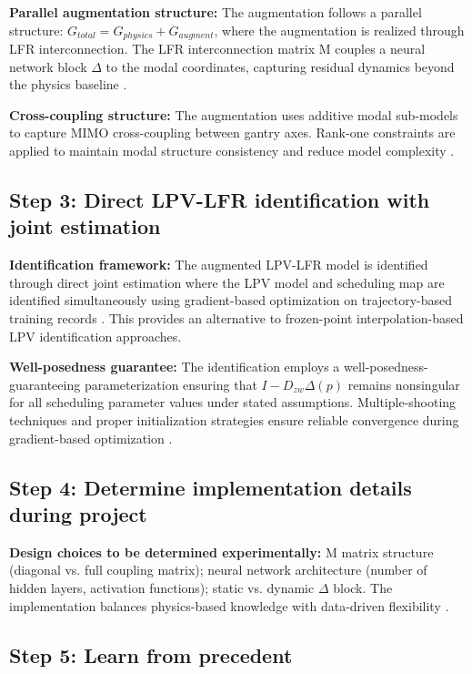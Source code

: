 \textbf{Parallel augmentation structure:}
The augmentation follows a parallel structure: $G_{total} = G_{physics} + G_{augment}$, where the augmentation is realized through LFR interconnection. The LFR interconnection matrix M couples a neural network block $\Delta$ to the modal coordinates, capturing residual dynamics beyond the physics baseline \citep{hoekstra2025learning, hoekstra2026extended}.

\textbf{Cross-coupling structure:}
The augmentation uses additive modal sub-models to capture MIMO cross-coupling between gantry axes. Rank-one constraints are applied to maintain modal structure consistency and reduce model complexity \citep{vanderhulst2025additive, vanderhulst2025rankone, gonzalez2025rankone}.

\subsection{Step 3: Direct LPV-LFR identification with joint estimation}

\textbf{Identification framework:}
The augmented LPV-LFR model is identified through direct joint estimation where the LPV model and scheduling map are identified simultaneously using gradient-based optimization on trajectory-based training records \citep{drenth2025efficient}. This provides an alternative to frozen-point interpolation-based LPV identification approaches.

\textbf{Well-posedness guarantee:}
The identification employs a well-posedness-guaranteeing parameterization ensuring that $I - D_{zw}\Delta(p)$ remains nonsingular for all scheduling parameter values under stated assumptions. Multiple-shooting techniques and proper initialization strategies ensure reliable convergence during gradient-based optimization \citep{drenth2025efficient}.

\subsection{Step 4: Determine implementation details during project}

\textbf{Design choices to be determined experimentally:}
M matrix structure (diagonal vs. full coupling matrix); neural network architecture (number of hidden layers, activation functions); static vs. dynamic $\Delta$ block. The implementation balances physics-based knowledge with data-driven flexibility \citep{schoukens2019nonlinear}.

\subsection{Step 5: Learn from precedent}

